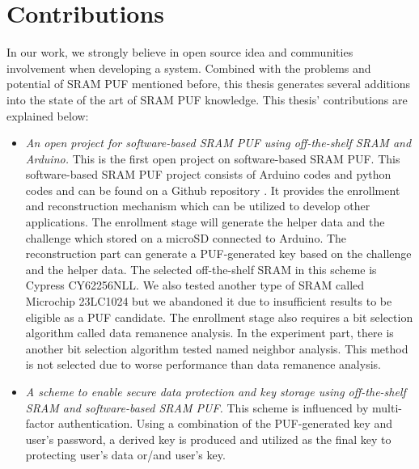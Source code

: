 \section{Contributions}
In our work, we strongly believe in open source idea and communities involvement when developing a system. Combined with the problems and potential of SRAM PUF mentioned before,
this thesis generates several additions into the state of the art of SRAM PUF knowledge. This thesis' contributions are explained below:
\begin{itemize}
    \item \textit{An open project for software-based SRAM PUF using off-the-shelf SRAM and Arduino.} This is the first open project on software-based SRAM PUF.
    This software-based SRAM PUF project consists of Arduino codes and python codes and can be found on a Github repository \cite{repository}. It provides the enrollment and reconstruction mechanism which can be utilized to develop other applications. The enrollment stage will generate the helper data and the challenge which stored on a microSD connected to Arduino. The reconstruction part can generate a PUF-generated key based on the challenge and the helper data. The selected off-the-shelf SRAM in this scheme is Cypress CY62256NLL. We also tested another type of SRAM called Microchip 23LC1024 but we abandoned it due to insufficient results to be eligible as a PUF candidate. The enrollment stage also requires a bit selection algorithm called data remanence analysis. In the experiment part, there is another bit selection algorithm tested named neighbor analysis. This method is not selected due to worse performance than data remanence analysis.
    \item \textit{A scheme to enable secure data protection and key storage using off-the-shelf SRAM and software-based SRAM PUF.} This scheme is influenced by multi-factor authentication. Using a combination of the PUF-generated key and user's password, a derived key is produced and utilized as the final key to protecting user's data or/and user's key.

\end{itemize}

